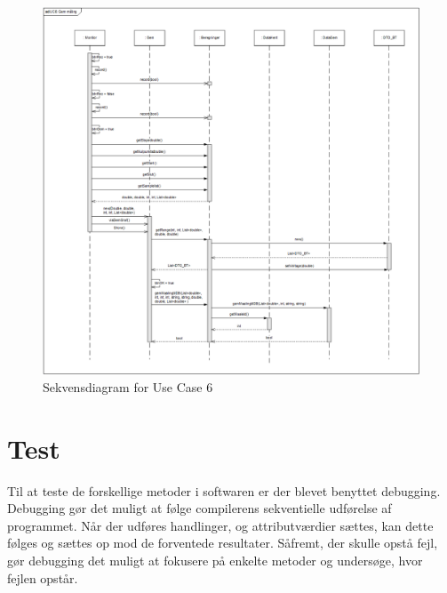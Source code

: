 \begin{figure}[H]
	\centering
	\includegraphics[width=1\textwidth]{Figurer/UC6_SD_SW}
	\caption{Sekvensdiagram for Use Case 6}
\end{figure}

\section{Test}
Til at teste de forskellige metoder i softwaren er der blevet benyttet debugging. Debugging gør det muligt at følge compilerens sekventielle udførelse af programmet. Når der udføres handlinger, og attributværdier sættes, kan dette følges og sættes op mod de forventede resultater. Såfremt, der skulle opstå fejl, gør debugging det muligt at fokusere på enkelte metoder og undersøge, hvor fejlen opstår.
